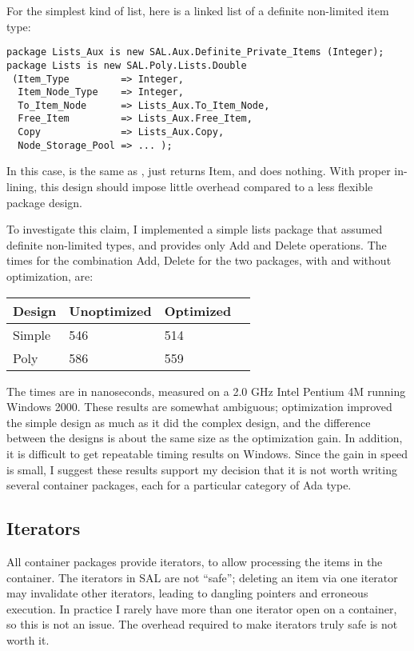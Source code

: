 \documentclass{article}
\begin{document}
For the simplest kind of list, here is a linked list of a definite
non-limited item type:
\begin{verbatim}
package Lists_Aux is new SAL.Aux.Definite_Private_Items (Integer);
package Lists is new SAL.Poly.Lists.Double
 (Item_Type         => Integer,
  Item_Node_Type    => Integer,
  To_Item_Node      => Lists_Aux.To_Item_Node,
  Free_Item         => Lists_Aux.Free_Item,
  Copy              => Lists_Aux.Copy,
  Node_Storage_Pool => ... );
\end{verbatim}
In this case,  is the same as ,
 just returns Item, and  does
nothing. With proper in-lining, this design should impose little
overhead compared to a less flexible package design. 

To investigate this claim, I implemented a simple lists package that
assumed definite non-limited types, and provides only Add and Delete
operations. The times for the combination Add, Delete for the two
packages, with and without optimization, are:

\begin{tabular}{llll}
\hline
Design & Unoptimized & Optimized \\
\hline
Simple & 546         & 514       \\
Poly   & 586         & 559       \\
\hline
\end{tabular}

The times are in nanoseconds, measured on a 2.0 GHz Intel Pentium 4M
running Windows 2000. These results are somewhat ambiguous;
optimization improved the simple design as much as it did the complex
design, and the difference between the designs is about the same size
as the optimization gain. In addition, it is difficult to get
repeatable timing results on Windows. Since the gain in speed is
small, I suggest these results support my decision that it is not
worth writing several container packages, each for a particular
category of Ada type.

\subsection{Iterators}
All container packages provide iterators, to allow processing the
items in the container. The iterators in SAL are not ``safe'';
deleting an item via one iterator may invalidate other iterators,
leading to dangling pointers and erroneous execution. In practice I
rarely have more than one iterator open on a container, so this is not
an issue. The overhead required to make iterators truly safe is not
worth it.
\end{document}
